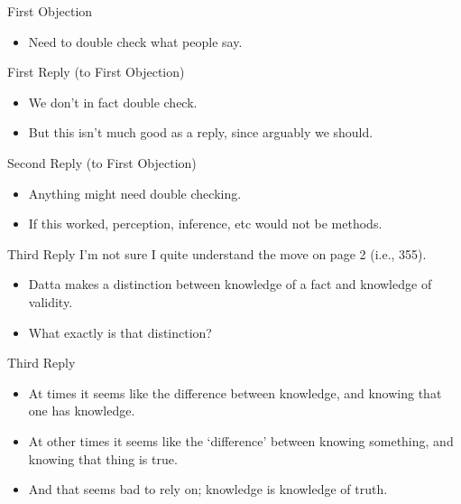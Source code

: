 \documentclass[
  17pt,
  letterpaper,
  ignorenonframetext,
  aspectratio=169,
  handout]{beamer}
\providecommand{\tightlist}{%
  \setlength{\itemsep}{0pt}\setlength{\parskip}{0pt}}\usepackage{longtable,booktabs,array}
\begin{document}
\begin{frame}{First Objection}
\protect\hypertarget{first-objection}{}
\begin{itemize}[<+->]
\tightlist
\item
  Need to double check what people say.
\end{itemize}
\end{frame}

\begin{frame}{First Reply (to First Objection)}
\protect\hypertarget{first-reply-to-first-objection}{}
\begin{itemize}[<+->]
\tightlist
\item
  We don't in fact double check.
\item
  But this isn't much good as a reply, since arguably we should.
\end{itemize}
\end{frame}

\begin{frame}{Second Reply (to First Objection)}
\protect\hypertarget{second-reply-to-first-objection}{}
\begin{itemize}[<+->]
\tightlist
\item
  Anything might need double checking.
\item
  If this worked, perception, inference, etc would not be methods.
\end{itemize}
\end{frame}

\begin{frame}{Third Reply}
\protect\hypertarget{third-reply}{}
I'm not sure I quite understand the move on page 2 (i.e., 355).

\begin{itemize}[<+->]
\tightlist
\item
  Datta makes a distinction between knowledge of a fact and knowledge of
  validity.
\item
  What exactly is that distinction?
\end{itemize}
\end{frame}

\begin{frame}{Third Reply}
\protect\hypertarget{third-reply-1}{}
\begin{itemize}[<+->]
\tightlist
\item
  At times it seems like the difference between knowledge, and knowing
  that one has knowledge.
\item
  At other times it seems like the `difference' between knowing
  something, and knowing that thing is true.
\item
  And that seems bad to rely on; knowledge is knowledge of truth.
\end{itemize}
\end{frame}
\end{document}
